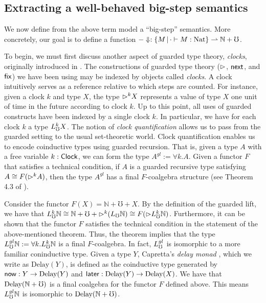\subsection{Extracting a well-behaved big-step semantics}\label{sec:big-step-term-semantics}


We now define from the above term model a ``big-step'' semantics. More
concretely, our goal is to define a function 
$-\Downarrow : \{M \,|\, \cdot \vdash M : \text{Nat} \} \rightharpoonup \mathbb{N} + {\mho}$.

To begin, we must first discuss another aspect of guarded type theory,
\emph{clocks}, originally introduced in \cite{atkey-mcbride2013}. The
constructions of guarded type theory (${\vartriangleright}$, $\mathsf{next}$, and $\mathsf{fix}$) we have been
using may be indexed by objects called \emph{clocks}. A clock intuitively serves
as a reference relative to which steps are counted. For instance, given a clock
$k$ and type $X$, the type ${\vartriangleright}^k X$ represents a value of type $X$ one unit
of time in the future according to clock $k$.
%
Up to this point, all uses of guarded constructs have been indexed by a single
clock $k$. In particular, we have for each clock $k$ a type $L_\mho^k X$. The
notion of \emph{clock quantification} allows us to pass from the guarded setting
to the usual set-theoretic world. Clock quantification enables us to encode
coinductive types using guarded recursion. That is, given a type $A$ with a free
variable $k : \mathsf{Clock}$, we can form the type $A^{gl} := \forall k. A$. Given a
functor $F$ that satisfies a technical condition, if $A$ is a guarded recursive
type satisfying $A \cong F({\vartriangleright}^k A)$, then the type $A^{gl}$ has a final
$F$-coalgebra structure (see Theorem 4.3 of
\cite{kristensen-mogelberg-vezzosi2022}). 

Consider the functor $F(X) = \mathbb{N} + {\mho} + X$. By the definition of the
guarded lift, we have that
% 
$L_\mho^k \mathbb{N} 
  \cong \mathbb{N} + {\mho} + {\vartriangleright}^k (L_\mho \mathbb{N}) 
  \cong F({\vartriangleright} L_\mho^k \mathbb{N})$.
%
Furthermore, it can be shown that the functor $F$ satisfies the technical
condition in the statement of the above-mentioned theorem. Thus, the theorem
implies that the type $L_\mho^{gl} \mathbb{N} := \forall k. L_\mho^k \mathbb{N}$ is a
final $F$-coalgebra. In fact, $L_\mho^{gl}$ is isomorphic to a more familiar coninductive type.
%
Given a type $Y$, Capretta's \emph{delay monad} \cite{lmcs:2265},
which we write as $\text{Delay}(Y)$, is defined as the coinductive type
generated by $\mathsf{now} : Y \to \text{Delay}(Y)$ and $\mathsf{later} : \text{Delay}(Y) \to \text{Delay}(X)$.
We have that $\text{Delay} (\mathbb{N} + {\mho})$ is a final coalgebra for the functor
$F$ defined above. This means $L_\mho^{gl} \mathbb{N}$ is isomorphic to
$\text{Delay}(\mathbb{N} + {\mho})$.


